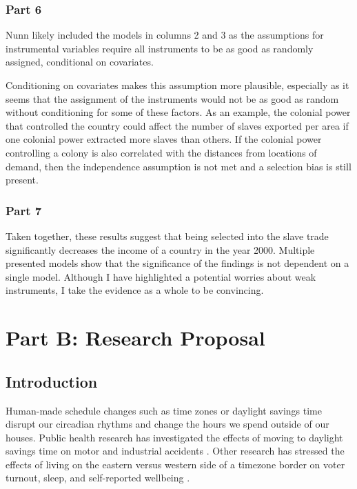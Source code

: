 \documentclass{article}\usepackage[]{graphicx}\usepackage[]{color}
\begin{document}
\subsubsection{Part 6}
Nunn likely included the models in columns 2 and 3 as the assumptions for instrumental variables require all instruments to be as good as randomly assigned, conditional on covariates.

Conditioning on covariates makes this assumption more plausible, especially as it seems that the assignment of the instruments would not be as good as random without conditioning for some of these factors.
As an example, the colonial power that controlled the country could affect the number of slaves exported per area if one colonial power extracted more slaves than others.
If the colonial power controlling a colony is also correlated with the distances from locations of demand, then the independence assumption is not met and a selection bias is still present.

\subsubsection{Part 7}
Taken together, these results suggest that being selected into the slave trade significantly decreases the income of a country in the year 2000.
Multiple presented models show that the significance of the findings is not dependent on a single model.
Although I have highlighted a potential worries about weak instruments, I take the evidence as a whole to be convincing.

\newpage
\section{Part B: Research Proposal}
\subsection{Introduction}

Human-made schedule changes such as time zones or daylight savings time disrupt our circadian rhythms and change the hours we spend outside of our houses.
Public health research has investigated the effects of moving to daylight savings time on motor and industrial accidents \parencites{Holland_2000}{Smith_2016}{Varughese_2001}.
Other research has stressed the effects of living on the eastern versus western side of a timezone border on voter turnout, sleep, and self-reported wellbeing \parencites[][]{Holbein_2019}{Giuntella_2019}.
\end{document}

